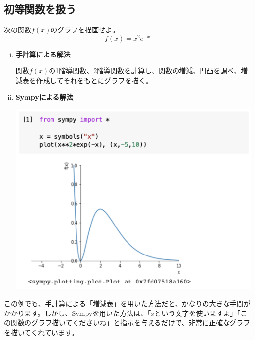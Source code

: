 \documentclass[12pt, a5paper]{bxjsbook}
\begin{document}
\subsection{初等関数を扱う}
\begin{framed}
\begin{exq}
次の関数$f(x)$のグラフを描画せよ。
$$f(x) = x^2e^{-x}$$
\end{exq}
\end{framed}
\begin{enumerate}[(i)]
    \item 
    {\bf 手計算による解法}
    
関数$f(x)$の1階導関数、2階導関数を計算し、関数の増減、凹凸を調べ、増減表を作成してそれをもとにグラフを描く。\\
    \item
    {\bf Sympyによる解法}
    \begin{center}
    \includegraphics[scale=0.3]{fig1-2-2.png}
    \end{center}    
\end{enumerate}
この例でも、手計算による「増減表」を用いた方法だと、かなりの大きな手間がかかります。しかし、Sympyを用いた方法は、「$x$という文字を使いますよ」「この関数のグラフ描いてくださいね」と指示を与えるだけで、非常に正確なグラフを描いてくれています。
\end{document}
